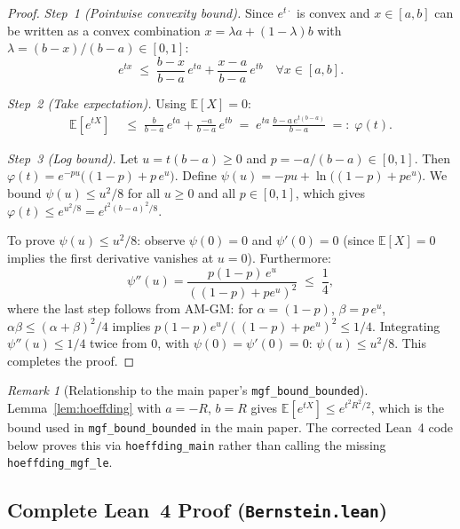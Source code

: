 \documentclass[11pt,a4paper]{article}
\theoremstyle{definition}
\theoremstyle{plain}
\theoremstyle{remark}
\newtheorem{remark}{Remark}[section]
\begin{document}
\begin{proof}
\textit{Step~1 (Pointwise convexity bound).}
Since $e^{t\cdot}$ is convex and $x \in [a,b]$ can be written as a
convex combination $x = \lambda a + (1-\lambda)b$ with
$\lambda = (b-x)/(b-a) \in [0,1]$:
\begin{equation}\label{eq:convex-bound}
  e^{tx} \;\le\; \frac{b-x}{b-a}\,e^{ta} + \frac{x-a}{b-a}\,e^{tb}
  \quad \forall x \in [a,b].
\end{equation}

\textit{Step~2 (Take expectation).}
Using $\mathbb{E}[X]=0$:
\begin{align}
  \mathbb{E}[e^{tX}]
  &\;\le\; \frac{b}{b-a}\,e^{ta} + \frac{-a}{b-a}\,e^{tb}
   \;=\; e^{ta}\,\frac{b - a\,e^{t(b-a)}}{b-a}
   \;=:\; \varphi(t).
   \label{eq:phi-def}
\end{align}

\textit{Step~3 (Log bound).}
Let $u = t(b-a) \ge 0$ and $p = -a/(b-a) \in [0,1]$.
Then $\varphi(t) = e^{-pu}\bigl((1-p) + p\,e^u\bigr)$.
Define $\psi(u) = -pu + \ln\bigl((1-p) + pe^u\bigr)$.
We bound $\psi(u) \le u^2/8$ for all $u \ge 0$ and all $p \in [0,1]$,
which gives $\varphi(t) \le e^{u^2/8} = e^{t^2(b-a)^2/8}$.

To prove $\psi(u) \le u^2/8$: observe $\psi(0) = 0$ and $\psi'(0) = 0$
(since $\mathbb{E}[X]=0$ implies the first derivative vanishes at $u=0$).
Furthermore:
\[
  \psi''(u) = \frac{p(1-p)\,e^u}{((1-p)+pe^u)^2}
  \;\le\; \frac{1}{4},
\]
where the last step follows from AM-GM:
for $\alpha = (1-p)$, $\beta = p\,e^u$,
$\alpha\beta \le (\alpha+\beta)^2/4$ implies
$p(1-p)e^u/((1-p)+pe^u)^2 \le 1/4$.
Integrating $\psi''(u) \le 1/4$ twice from 0, with $\psi(0)=\psi'(0)=0$:
$\psi(u) \le u^2/8$.
This completes the proof.
\end{proof}

\begin{remark}[Relationship to the main paper's \texttt{mgf\_bound\_bounded}]
Lemma~\ref{lem:hoeffding} with $a = -R$, $b = R$ gives
$\mathbb{E}[e^{tX}] \le e^{t^2R^2/2}$, which is the bound used
in \texttt{mgf\_bound\_bounded} in the main paper.
The corrected Lean~4 code below proves this via
\texttt{hoeffding\_main} rather than calling the missing
\texttt{hoeffding\_mgf\_le}.
\end{remark}

\subsection{Complete Lean~4 Proof (\texttt{Bernstein.lean})}
\label{sec:gap2-lean}
\end{document}
